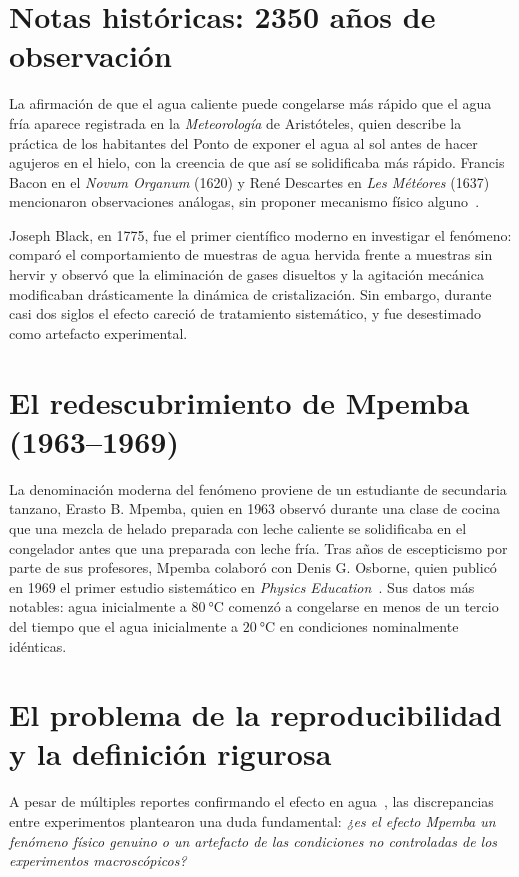 \section{Notas históricas: 2350 años de observación}

La afirmación de que el agua caliente puede congelarse más rápido que el agua fría 
aparece registrada en la \emph{Meteorología} de Aristóteles, quien describe la 
práctica de los habitantes del Ponto de exponer el agua al sol antes de hacer agujeros 
en el hielo, con la creencia de que así se solidificaba más rápido. Francis Bacon 
en el \emph{Novum Organum} (1620) y René Descartes en \emph{Les Météores} (1637) 
mencionaron observaciones análogas, sin proponer mecanismo físico alguno~\cite{burridge2016, hallstadius2020}.

Joseph Black, en 1775, fue el primer científico moderno en investigar el fenómeno: 
comparó el comportamiento de muestras de agua hervida frente a muestras sin hervir y 
observó que la eliminación de gases disueltos y la agitación mecánica modificaban 
drásticamente la dinámica de cristalización. Sin embargo, durante casi dos siglos 
el efecto careció de tratamiento sistemático, y fue desestimado como artefacto 
experimental.

\section{El redescubrimiento de Mpemba (1963--1969)}

La denominación moderna del fenómeno proviene de un estudiante de secundaria 
tanzano, Erasto B. Mpemba, quien en 1963 observó durante una clase de cocina que 
una mezcla de helado preparada con leche caliente se solidificaba en el congelador 
antes que una preparada con leche fría. Tras años de escepticismo por parte de sus 
profesores, Mpemba colaboró con Denis G. Osborne, quien publicó en 1969 el primer 
estudio sistemático en \emph{Physics Education}~\cite{mpemba1969}. Sus datos más 
notables: agua inicialmente a $\SI{80}{\celsius}$ comenzó a congelarse en menos 
de un tercio del tiempo que el agua inicialmente a $\SI{20}{\celsius}$ en condiciones 
nominalmente idénticas.

\section{El problema de la reproducibilidad y la definición rigurosa}

A pesar de múltiples reportes confirmando el efecto en agua~\cite{burridge2016}, las 
discrepancias entre experimentos plantearon una duda fundamental: \emph{¿es el 
efecto Mpemba un fenómeno físico genuino o un artefacto de las condiciones no 
controladas de los experimentos macroscópicos?}

